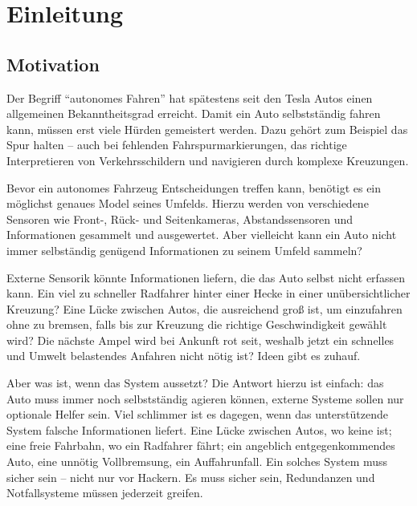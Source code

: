 
\chapter{Einleitung}

\section{Motivation}
Der Begriff \enquote{autonomes Fahren} hat spätestens seit den Tesla Autos einen allgemeinen Bekanntheitsgrad erreicht. Damit ein Auto selbstständig fahren kann, müssen erst viele Hürden gemeistert werden.
Dazu gehört zum Beispiel das Spur halten -- auch bei fehlenden Fahrspurmarkierungen, das richtige Interpretieren von Verkehrsschildern und navigieren durch komplexe Kreuzungen. 

Bevor ein autonomes Fahrzeug Entscheidungen treffen kann, benötigt es ein möglichst genaues Model seines Umfelds.
Hierzu werden von verschiedene Sensoren wie Front-, Rück- und Seitenkameras, Abstandssensoren und  Informationen gesammelt und ausgewertet. Aber vielleicht kann ein Auto nicht immer selbständig genügend Informationen zu seinem Umfeld sammeln? 

Externe Sensorik könnte Informationen liefern, die das Auto selbst nicht erfassen kann.
Ein viel zu schneller Radfahrer hinter einer Hecke in einer unübersichtlicher Kreuzung?
Eine Lücke zwischen Autos, die ausreichend groß ist, um einzufahren ohne zu bremsen, falls bis zur Kreuzung die richtige Geschwindigkeit gewählt wird?
Die nächste Ampel wird bei Ankunft rot seit, weshalb jetzt ein schnelles und Umwelt belastendes Anfahren nicht nötig ist?
Ideen gibt es zuhauf.

Aber was ist, wenn das System aussetzt?
Die Antwort hierzu ist einfach: das Auto muss immer noch selbstständig agieren können, externe Systeme sollen nur optionale Helfer sein.
Viel schlimmer ist es dagegen, wenn das unterstützende System falsche Informationen liefert.
Eine Lücke zwischen Autos, wo keine ist; eine freie Fahrbahn, wo ein Radfahrer fährt; ein angeblich entgegenkommendes Auto, eine unnötig Vollbremsung, ein Auffahrunfall.
Ein solches System muss sicher sein -- nicht nur vor Hackern.
Es muss  sicher sein, Redundanzen und Notfallsysteme müssen jederzeit greifen.

